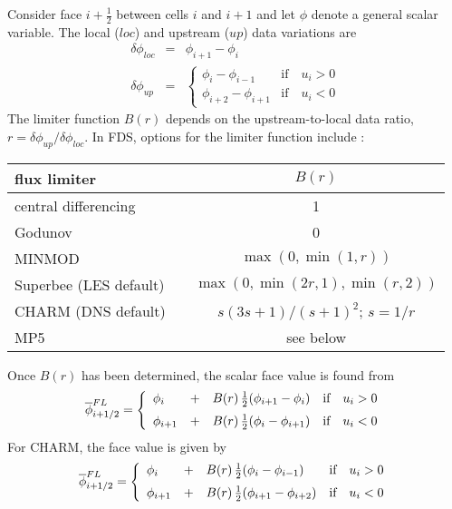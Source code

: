 Consider face $i+\frac{1}{2}$ between cells $i$ and $i+1$ and let $\phi$ denote a general scalar variable.  The local ($loc$) and upstream ($up$) data variations are
\begin{eqnarray}
\delta \phi_{loc} &=& \phi_{i+1}-\phi_i \\
\delta \phi_{up}  &=& \left\{ \begin{array}{ll} \phi_i-\phi_{i-1} & \mbox{if} \quad u_i>0 \\ \phi_{i+2}-\phi_{i+1} & \mbox{if} \quad u_i<0 \end{array} \right. 
\end{eqnarray}
The limiter function $B(r)$ depends on the upstream-to-local data ratio, $r=\delta \phi_{up}/\delta \phi_{loc}$. In FDS, options for the limiter function include \cite{Toro}:

\begin{table}[h!]
\begin{center}
\begin{tabular}{lcc}
flux limiter          && $B(r)$ \\
\hline
central differencing     && 1      \\
Godunov                  && 0      \\
MINMOD                   && $\max(0,\min(1,r))$ \\
Superbee \cite{Roe:1986} (LES default) && $\max(0,\min(2r,1),\min(r,2))$ \\
CHARM \cite{Zhou:1995} (DNS default)   && $s(3s+1)/(s+1)^2$; $s=1/r$ \\
MP5 \cite{Suresh:1997}   && see below
\end{tabular}
\end{center}
\end{table}

Once $B(r)$ has been determined, the scalar face value is found from
\begin{equation}
\label{eqn_flux_limiter}
\overline{\phi}^{FL}_{i+1/2} = \left\{ \begin{array}{lcll} \phi_i &+& B(r) \,\frac{1}{2}(\phi_{i+1}-\phi_i) & \mbox{if} \quad u_i>0 \vspace{0.2 cm}\\
\phi_{i+1} &+& B(r) \,\frac{1}{2}(\phi_i-\phi_{i+1}) & \mbox{if} \quad u_i<0 \end{array} \right.
\end{equation}
For CHARM, the face value is given by~\cite{Kempf:2003}
\begin{equation}
\label{eqn_charm_limiter}
\overline{\phi}^{FL}_{i+1/2} = \left\{ \begin{array}{lcll} \phi_i &+& B(r) \,\frac{1}{2}(\phi_i-\phi_{i-1}) & \mbox{if} \quad u_i>0 \vspace{0.2 cm}\\
\phi_{i+1} &+& B(r) \,\frac{1}{2}(\phi_{i+1}-\phi_{i+2}) & \mbox{if} \quad u_i<0 \end{array} \right.
\end{equation}

